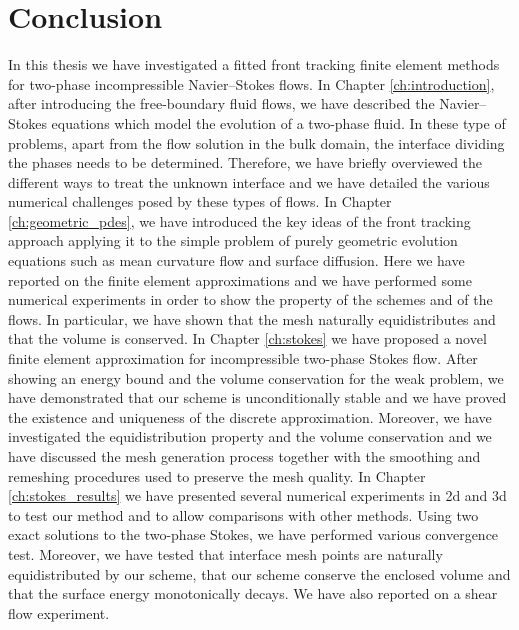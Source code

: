 \chapter{\sc Conclusion}\label{ch:conclusion}

In this thesis we have investigated a fitted front tracking finite element
methods for two-phase incompressible Navier--Stokes flows. In Chapter
\ref{ch:introduction}, after introducing the free-boundary fluid flows, we have
described the Navier--Stokes equations which model the evolution of a two-phase
fluid. In these type of problems, apart from the flow solution in the bulk
domain, the interface dividing the phases needs to be determined. Therefore, we
have briefly overviewed the different ways to treat the unknown interface and we
have detailed the various numerical challenges posed by these types of flows.
In Chapter \ref{ch:geometric_pdes}, we have introduced the key ideas of the
front tracking approach applying it to the simple problem of purely geometric
evolution equations such as mean curvature flow and surface diffusion. Here we
have reported on the finite element approximations and we have performed some
numerical experiments in order to show the property of the schemes and of the
flows. In particular, we have shown that the mesh naturally equidistributes and
that the volume is conserved. In Chapter \ref{ch:stokes} we have proposed a
novel finite element approximation for incompressible two-phase Stokes flow.
After showing an energy bound and the volume conservation for the weak problem,
we have demonstrated that our scheme is unconditionally stable and we have
proved the existence and uniqueness of the discrete approximation. Moreover, we
have investigated the equidistribution property and the volume conservation and
we have discussed the mesh generation process together with the smoothing and
remeshing procedures used to preserve the mesh quality. In Chapter
\ref{ch:stokes_results} we have presented several numerical experiments in 2d
and 3d to test our method and to allow comparisons with other methods. Using
two exact solutions to the two-phase Stokes, we have performed various
convergence test. Moreover, we have tested that interface mesh points are
naturally equidistributed by our scheme, that our scheme conserve the enclosed
volume and that the surface energy monotonically decays. We have also reported
on a shear flow experiment.